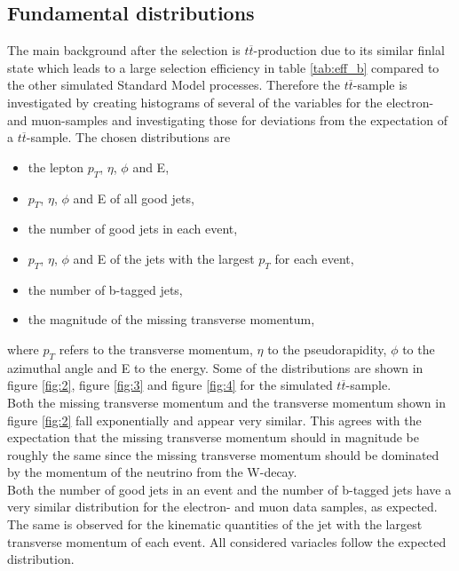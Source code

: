 \begin{table}[H]
  \end{table}


\subsection{Fundamental distributions} \label{sec:sekunde}
The main background after the selection is $t \overline{t}$-production due to its similar finlal state which leads to a large selection efficiency 
in table \ref{tab:eff_b} compared to the other simulated Standard Model processes. 
Therefore the $t \overline{t}$-sample is investigated by creating 
histograms of several of the variables for the electron- and muon-samples 
and investigating those for deviations from the expectation of a $t \overline{t}$-sample. 
The chosen distributions are 
\begin{itemize}
  \item the lepton $p_T$, $\eta$, $\phi$ and E,
  \item $p_T$, $\eta$, $\phi$ and E  of all good jets,
  \item the number of good jets in each event, 
  \item $p_T$, $\eta$, $\phi$ and E of the jets with the largest $p_T$ for each event,
  \item the number of b-tagged jets, 
  \item the magnitude of the missing transverse momentum, 
\end{itemize}
where $p_T$ refers to the transverse momentum, $\eta$ to the pseudorapidity, $\phi$ to the azimuthal angle and E to the energy. 
Some of the distributions are shown in figure \ref{fig:2}, figure \ref{fig:3} and figure \ref{fig:4} for the simulated $t\overline{t}$-sample. \\
Both the missing transverse momentum and the transverse momentum shown in figure \ref{fig:2} fall exponentially and appear very similar. 
This agrees with the expectation that the missing transverse momentum should in magnitude be roughly the same since the missing 
transverse momentum should be dominated by the momentum of the neutrino from the W-decay. \\
Both the number of good jets in an event and the number of b-tagged jets have a very similar distribution for the electron- and muon data samples, as 
expected. The same is observed for the kinematic quantities of the jet with the largest transverse momentum of each event. All considered variacles follow 
the expected distribution. 

